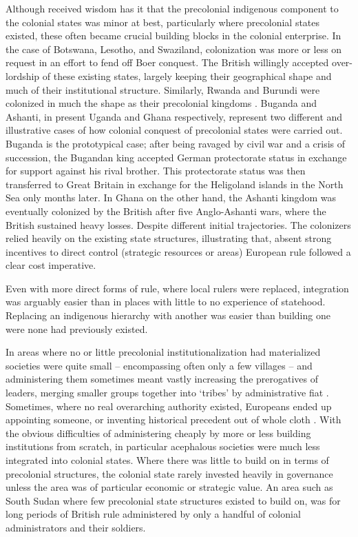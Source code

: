 Although received wisdom has it that the precolonial indigenous component to the
colonial states was minor at best, particularly where precolonial states
existed, these often became crucial building blocks in the colonial enterprise.
In the case of Botswana, Lesotho, and Swaziland, colonization was more or less
on request in an effort to fend off Boer conquest. The British willingly
accepted over-lordship of these existing states, largely keeping their
geographical shape and much of their institutional structure. Similarly, Rwanda
and Burundi were colonized in much the shape as their precolonial kingdoms
\citep[45f]{englebert2013inside}. Buganda and Ashanti, in present Uganda and
Ghana respectively, represent two different and illustrative cases of how
colonial conquest of precolonial states were carried out. Buganda is the
prototypical case; after being ravaged by civil war and a crisis of succession,
the Bugandan king accepted German protectorate status in exchange for support
against his rival brother. This protectorate status was then transferred to
Great Britain in exchange for the Heligoland islands in the North Sea only
months later. In Ghana on the other hand, the Ashanti kingdom was eventually
colonized by the British after five Anglo-Ashanti wars, where the British
sustained heavy losses. Despite different initial trajectories. The colonizers
relied heavily on the existing state structures, illustrating that, absent
strong incentives to direct control (strategic resources or areas) European rule
followed a clear cost imperative. 

Even with more direct forms of rule, where local rulers were replaced,
integration was arguably easier than in places with little to no experience of
statehood. Replacing an indigenous hierarchy with another was easier than
building one were none had previously existed. 

In areas where no or little precolonial institutionalization had materialized
societies were quite small -- encompassing often only a few villages -- and
administering them sometimes meant vastly increasing the prerogatives of
leaders, merging smaller groups together into `tribes' by administrative fiat
\citep{boone2014property}. Sometimes, where no real overarching authority
existed, Europeans ended up appointing someone, or inventing historical
precedent out of whole cloth \citep{mamdani1996citizen}. With the obvious
difficulties of administering cheaply by more or less building institutions from
scratch, in particular acephalous societies were much less integrated into
colonial states. Where there was little to build on in terms of precolonial
structures, the colonial state rarely invested heavily in governance unless the
area was of particular economic or strategic value. An area such as South Sudan
where few precolonial state structures existed to build on, was for long
periods of British rule administered by only a handful of colonial
administrators and their soldiers.  

